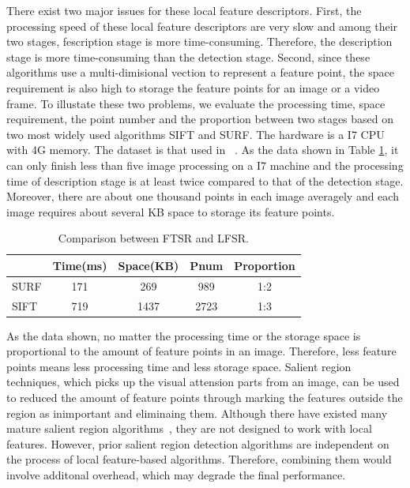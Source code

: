 There exist two major issues for these local feature descriptors. First, the processing speed of these local feature descriptors are very slow and among their two stages, fescription stage is more time-consuming. Therefore, the description stage is more time-consuming than the detection stage. Second, since these algorithms use a multi-dimisional vection to represent a feature point, the space requirement is also high to storage the feature points for an image or a video frame. To illustate these two problems, we evaluate the processing time, space requirement, the point number and the proportion between two stages based on two most widely used algorithms SIFT and SURF. The hardware is a I7 CPU with 4G memory. The dataset is that used in ~\cite{mikolajczyk2005performance}. As the data shown in Table \ref{tab:surfandsift}, it can only finish less than five image processing on a I7 machine and the processing time of description stage is at least twice compared to that of the detection stage. Moreover, there are about one thousand points in each image averagely and each image requires about several KB space to storage its feature points.

\begin{table}[!t]
\begin{center}
\begin{tabular}{|l|c|c|c|c|}
\hline
 & Time(ms) & Space(KB) & Pnum & Proportion \\
\hline
SURF & 171 & 269 & 989   &  1:2\\\hline
SIFT & 719 & 1437 & 2723 & 1:3 \\\hline
\end{tabular}
\end{center}
\caption{Comparison between FTSR and LFSR.}
\label{tab:surfandsift}
\end{table}

As the data shown, no matter the processing time or the storage space is proportional to the amount of feature points in an image. Therefore, less feature points means  less processing time and less storage space. Salient region techniques, which picks up the visual attension parts from an image, can be used to reduced the amount of feature points through marking the features outside the region as inimportant and eliminaing them. Although there have existed many mature salient region algorithms~\cite{cheng2011global,achanta2009frequency,itti1998model}, they are not designed to work with local features. However, prior salient region detection algorithms are independent on the process of local feature-based algorithms. Therefore,  combining them would involve additonal overhead, which may degrade the final performance.

